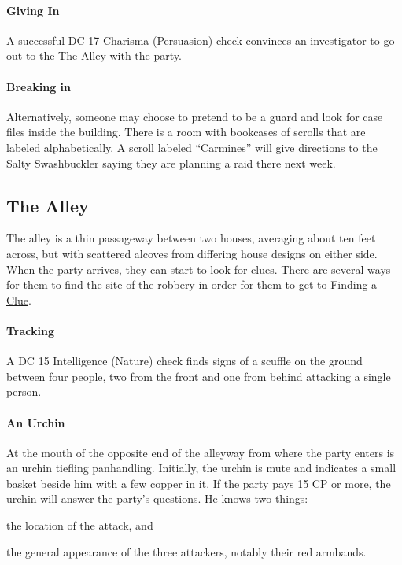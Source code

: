 \documentclass[10pt,twocolumn,openany,nodeprecatedcode,bg=none,inline]{dndbook}
\begin{document}
\paragraph{Giving In}
A successful DC 17 Charisma (Persuasion) check convinces an investigator to go out to the \hyperref[sec:alley]{The Alley} with the party.

\paragraph{Breaking in}
Alternatively, someone may choose to pretend to be a guard and look for case files inside the building.
There is a room with bookcases of scrolls that are labeled alphabetically.
A scroll labeled ``Carmines'' will give directions to the Salty Swashbuckler saying they are planning a raid there next week.

\subsection{The Alley}
\label{sec:alley}
The alley is a thin passageway between two houses, averaging about ten feet across, but with scattered alcoves from differing house designs on either side.
When the party arrives, they can start to look for clues.
There are several ways for them to find the site of the robbery in order for them to get to \hyperref[sec:clue]{Finding a Clue}.

\paragraph{Tracking}
A DC 15 Intelligence (Nature) check finds signs of a scuffle on the ground between four people, two from the front and one from behind attacking a single person.

\paragraph{An Urchin}
At the mouth of the opposite end of the alleyway from where the party enters is an urchin tiefling panhandling.
Initially, the urchin is mute and indicates a small basket beside him with a few copper in it.
If the party pays 15 CP or more, the urchin will answer the party's questions.
He knows two things:
\begin{enumerate*}[label={(\arabic*)}]
  \item the location of the attack, and
  \item the general appearance of the three attackers, notably their red armbands.
\end{enumerate*}
\end{document}
